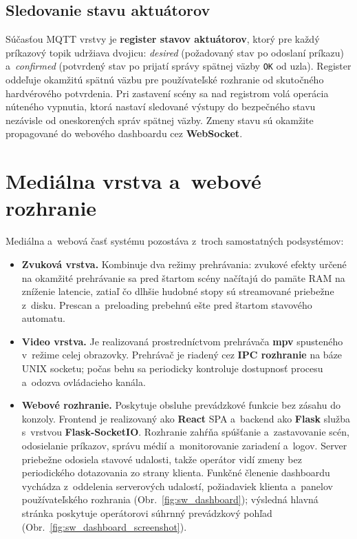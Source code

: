 \subsection{Sledovanie stavu aktuátorov}
\label{SWActuatorStore}

Súčasťou MQTT vrstvy je \textbf{register stavov aktuátorov},
ktorý pre každý príkazový topik udržiava dvojicu:
\textit{desired} (požadovaný stav po odoslaní príkazu)
a~\textit{confirmed} (potvrdený stav po prijatí správy spätnej väzby
\texttt{OK} od uzla). Register oddeľuje okamžitú spätnú väzbu
pre používateľské rozhranie od skutočného hardvérového potvrdenia.
Pri zastavení scény sa nad registrom volá operácia núteného vypnutia,
ktorá nastaví sledované výstupy do bezpečného stavu nezávisle
od oneskorených správ spätnej väzby. Zmeny stavu sú okamžite
propagované do webového dashboardu cez \textbf{WebSocket}.

\section{Mediálna vrstva a~webové rozhranie}
\label{SWMediaWeb}

Mediálna a~webová časť systému pozostáva z~troch samostatných podsystémov:

\begin{itemize}
    \item \textbf{Zvuková vrstva.}
        Kombinuje dva režimy prehrávania: zvukové efekty určené
        na okamžité prehrávanie sa pred štartom scény načítajú
        do pamäte RAM na zníženie latencie,
        zatiaľ čo dlhšie hudobné stopy sú streamované priebežne
        z~disku. Prescan a~preloading prebehnú ešte pred štartom
        stavového automatu.

    \item \textbf{Video vrstva.}
        Je realizovaná prostredníctvom prehrávača \textbf{mpv}
        spusteného v~režime celej obrazovky. Prehrávač je riadený
        cez \textbf{IPC rozhranie} na báze UNIX socketu; počas
        behu sa periodicky kontroluje dostupnosť procesu
        a~odozva ovládacieho kanála.

    \item \textbf{Webové rozhranie.}
        Poskytuje obsluhe prevádzkové funkcie bez zásahu
        do konzoly. Frontend je realizovaný ako \textbf{React} SPA
        a~backend ako \textbf{Flask} služba s~vrstvou
        \textbf{Flask-SocketIO}. Rozhranie zahŕňa spúšťanie
        a~zastavovanie scén, odosielanie príkazov, správu médií
        a~monitorovanie zariadení a~logov. Server priebežne odosiela
        stavové udalosti, takže operátor vidí zmeny bez periodického
        dotazovania zo strany klienta.
        Funkčné členenie dashboardu vychádza z~oddelenia
        serverových udalostí, požiadaviek klienta a~panelov
        používateľského rozhrania (Obr.~\ref{fig:sw_dashboard});
        výsledná hlavná stránka poskytuje operátorovi súhrnný
        prevádzkový pohľad (Obr.~\ref{fig:sw_dashboard_screenshot}).
\end{itemize}

